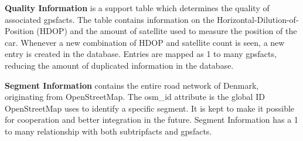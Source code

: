 \textbf{Quality Information} is a support table which determines the quality of associated gpsfacts. The table contains information on the Horizontal-Dilution-of-Position (HDOP) and the amount of satellite used to measure the position of the car. Whenever a new combination of HDOP and satellite count is seen, a new entry is created in the database. Entries are mapped as 1 to many gpsfacts, reducing the amount of duplicated information in the database.

\textbf{Segment Information} contains the entire road network of Denmark, originating from OpenStreetMap. The osm\_id  attribute is the global ID OpenStreetMap uses to identify a specific segment. It is kept to make it possible for cooperation and better integration in the future. Segment Information has a 1 to many relationship with both subtripfacts and gpsfacts.